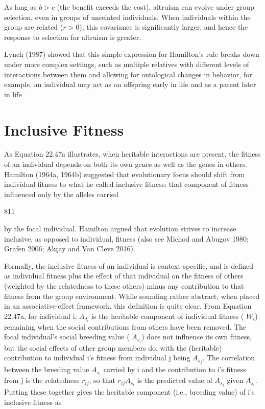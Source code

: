 \documentclass{article}
\begin{document}
As long as $b > c$ (the benefit exceeds the cost), altruism can evolve under group selection, even in groups of unrelated individuals. When individuals within the group are related ($r > 0$), this covariance is significantly larger, and hence the response to selection for altruism is greater.

Lynch (1987) showed that this simple expression for Hamilton’s rule breaks down under more complex settings, such as multiple relatives with different levels of interactions between them and allowing for ontological changes in behavior, for example, an individual may act as an offspring early in life and as a parent later in life

\section{Inclusive Fitness}
As Equation 22.47a illustrates, when heritable interactions are present, the fitness of an individual depends on both its own genes as well as the genes in others. Hamilton (1964a, 1964b) suggested that evolutionary focus should shift from individual fitness to what he called inclusive fitness: that component of fitness influenced only by the alleles carried

811

by the focal individual. Hamilton argued that evolution strives to increase inclusive, as opposed to individual, fitness (also see Michod and Abugov 1980; Grafen 2006; Akçay and Van Cleve 2016).

Formally, the inclusive fitness of an individual is context specific, and is defined as individual fitness plus the effect of that individual on the fitness of others (weighted by the relatedness to these others) minus any contribution to that fitness from the group environment. While sounding rather abstract, when placed in an associative-effect framework, this definition is quite clear. From Equation 22.47a, for individual i,  $ A_{d_i} $ is the heritable component of individual fitness ( $ W_i $) remaining when the social contributions from others have been removed. The focal individual's social breeding value ( $ A_{s_i} $) does not influence its own fitness, but the social effects of other group members do, with the (heritable) contribution to individual i's fitness from individual j being  $ A_{s_j} $. The correlation between the breeding value  $ A_{s_i} $ carried by i and the contribution to i's fitness from j is the relatedness  $ r_{ij} $, so that  $ r_{ij}A_{s_i} $ is the predicted value of  $ A_{s_j} $ given  $ A_{s_i} $. Putting these together gives the heritable component (i.e., breeding value) of i's inclusive fitness as
\end{document}
